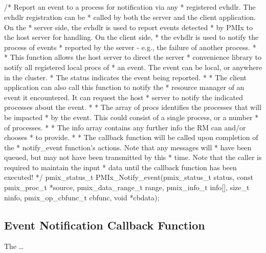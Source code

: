 \subsection{}

\cspecificstart
\begin{codepar}
/* Report an event to a process for notification via any
 * registered evhdlr. The evhdlr registration can be
 * called by both the server and the client application. On the
 * server side, the evhdlr is used to report events detected
 * by PMIx to the host server for handling. On the client side,
 * the evhdlr is used to notify the process of events
 * reported by the server - e.g., the failure of another process.
 *
 * This function allows the host server to direct the server
 * convenience library to notify all registered local procs of
 * an event. The event can be local, or anywhere in the cluster.
 * The status indicates the event being reported.
 *
 * The client application can also call this function to notify the
 * resource manager of an event it encountered. It can request the host
 * server to notify the indicated processes about the event.
 *
 * The array of procs identifies the processes that will be impacted
 * by the event. This could consist of a single process, or a number
 * of processes.
 *
 * The info array contains any further info the RM can and/or chooses
 * to provide.
 *
 * The callback function will be called upon completion of the
 * notify_event function's actions. Note that any messages will
 * have been queued, but may not have been transmitted by this
 * time. Note that the caller is required to maintain the input
 * data until the callback function has been executed!
*/
pmix_status_t
PMIx_Notify_event(pmix_status_t status,
                  const pmix_proc_t *source,
                  pmix_data_range_t range,
                  pmix_info_t info[], size_t ninfo,
                  pmix_op_cbfunc_t cbfunc, void *cbdata);
\end{codepar}
\cspecificend


\subsection{Event Notification Callback Function}

The  \ldots

